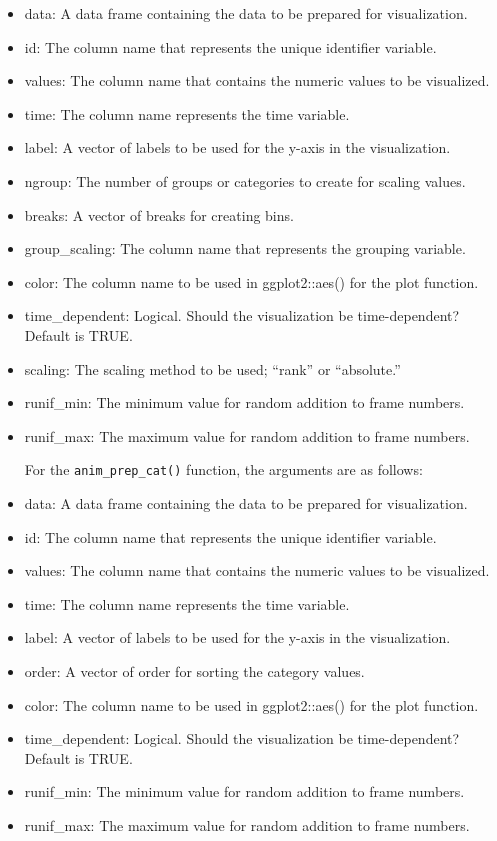 \begin{itemize}
\item
  data: A data frame containing the data to be prepared for visualization.
\item
  id: The column name that represents the unique identifier variable.
\item
  values: The column name that contains the numeric values to be visualized.
\item
  time: The column name represents the time variable.
\item
  label: A vector of labels to be used for the y-axis in the visualization.
\item
  ngroup: The number of groups or categories to create for scaling values.
\item
  breaks: A vector of breaks for creating bins.
\item
  group\_scaling: The column name that represents the grouping variable.
\item
  color: The column name to be used in ggplot2::aes() for the plot function.
\item
  time\_dependent: Logical. Should the visualization be time-dependent? Default is TRUE.
\item
  scaling: The scaling method to be used; ``rank'' or ``absolute.''
\item
  runif\_min: The minimum value for random addition to frame numbers.
\item
  runif\_max: The maximum value for random addition to frame numbers.

  For the \texttt{anim\_prep\_cat()} function, the arguments are as follows:
\item
  data: A data frame containing the data to be prepared for visualization.
\item
  id: The column name that represents the unique identifier variable.
\item
  values: The column name that contains the numeric values to be visualized.
\item
  time: The column name represents the time variable.
\item
  label: A vector of labels to be used for the y-axis in the visualization.
\item
  order: A vector of order for sorting the category values.
\item
  color: The column name to be used in ggplot2::aes() for the plot function.
\item
  time\_dependent: Logical. Should the visualization be time-dependent? Default is TRUE.
\item
  runif\_min: The minimum value for random addition to frame numbers.
\item
  runif\_max: The maximum value for random addition to frame numbers.
\end{itemize}

